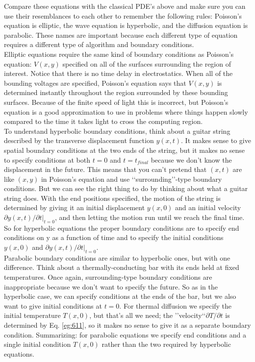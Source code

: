 \documentclass{book}
\theoremstyle{plain}
\theoremstyle{definition}
\numberwithin{exm}{chapter}
\theoremstyle{remark}
\theoremstyle{summary}
\theoremstyle{overview}
\begin{document}
Compare these equations with the classical PDE\rq s above and make sure you can use their resemblances to each other to remember the following rules: Poisson\rq s equation is elliptic, the wave equation is hyperbolic, and the diffusion equation is parabolic. These names are important because each different type of equation requires a different type of algorithm and boundary conditions. \\  Elliptic equations require the same kind of boundary conditions as Poisson\rq s equation: $V (x, y)$ specified on all of the surfaces surrounding the region of interest. Notice that there is no time delay in electrostatics. When all of the bounding voltages are specified, Poisson\rq s equation says that $V(x, y)$ is determined instantly throughout the region surrounded by these bounding surfaces. Because of the finite speed of light this is incorrect, but Poisson\rq s equation is a good approximation to use in problems where things happen slowly compared to the time it takes light to cross the computing region. \\
To understand hyperbolic boundary conditions, think about a guitar string
described by the transverse displacement function $y(x,t)$. It makes sense to
give spatial boundary conditions at the two ends of the string, but it makes no
sense to specify conditions at both $t = 0$ and $t = t_{final}$ because we don\rq t know the
displacement in the future. This means that you can\rq t pretend that $(x,t)$ are like
$(x, y)$ in Poisson\rq s equation and use \lq\lq surrounding\rq\rq -type boundary conditions. But
we can see the right thing to do by thinking about what a guitar string does. With
the end positions specified, the motion of the string is determined by giving it an
initial displacement $y(x,0)$ and an initial velocity $\partial y(x,t)/ \partial t\vert_{t=0}$, and then letting
the motion run until we reach the final time. So for hyperbolic equations the
proper boundary conditions are to specify end conditions on y as a function of
time and to specify the initial conditions $y(x,0)$ and $\partial y(x,t)/ \partial t\vert_{t=0}$. \\

Parabolic boundary conditions are similar to hyperbolic ones, but with one difference. Think about a thermally-conducting bar with its ends held at fixed
temperatures. Once again, surrounding-type boundary conditions are inappropriate because we don\rq t want to specify the future. So as in the hyperbolic case,
we can specify conditions at the ends of the bar, but we also want to give initial conditions at $t = 0$. For thermal diffusion we specify the initial temperature
$T (x,0)$, but that\rq s all we need; the \rq\rq velocity\lq\lq $\partial T / \partial t$ is determined by Eq. \eqref{eg:611},
so it makes no sense to give it as a separate boundary condition. Summarizing:
for parabolic equations we specify end conditions and a single initial condition
$T (x,0)$ rather than the two required by hyperbolic equations. \\ 
\end{document}
